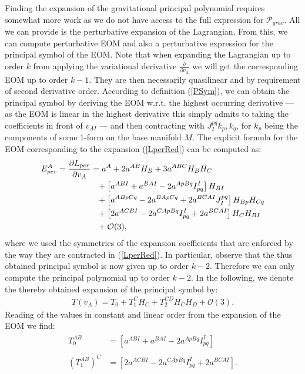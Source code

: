 Finding the expansion of the gravitational principal polynomial requires somewhat more work as we do not have access to the full expression for $\mathcal{P}_{grav}$. All we can provide is the perturbative expansion of the Lagrangian. From this, we can compute perturbative EOM and also a perturbative expression for the principal symbol of the EOM.
Note that when expanding the Lagrangian up to order $k$ from applying the variational derivative $\frac{\partial}{\partial v_A}$ we will get the corresponding EOM up to order $k-1$. They are then necessarily quasilinear and by requirement of second derivative order. According to definition (\ref{PSym}), we can obtain the principal symbol by deriving the EOM w.r.t. the highest occurring derivative  --- as the EOM is linear in the highest derivative this simply admits to taking the coefficients in front of $v_{AI}$ --- and then contracting with $J_I^{pq} k_p, k_q$, for $k_p$ being the components of some 1-form on the base manifold $M$. 
The explicit formula for the EOM corresponding to the expansion (\ref{LperRed}) can be computed as:
\begin{align}\label{EOMPert}
    \begin{aligned}
    E_{per}^A = \frac{\partial L_{per}}{\partial v_A} &= a^A + 2 a^{AB}H_B + 3a^{ABC}H_B H_C \\
    &\hphantom{=}+ \left [a^{ABI} + a^{BAI} - 2 a^{ApBq}I_{pq}^I  \right ] H_{BI} \\
    &\hphantom{=}+ \left[a^{ABpCq} -2a^{BApCq} +2a^{BCAI} J_I^{pq} \right]H_{Bp}H_{Cq} \\
    &\hphantom{=}+ \left [2a^{ACBI} -2a^{CApBq}I_{pq}^I + 2a^{BCAI} \right ]H_C H_{BI} \\
    &\hphantom{=}+ \mathcal{O}(3),
    \end{aligned}
\end{align}
where we used the symmetries of the expansion coefficients that are enforced by the way they are contracted in (\ref{LperRed}).
In particular, observe that the thus obtained principal symbol is now given up to order $k-2$. Therefore we can only compute the principal polynomial up to order $k-2$. In the following, we denote the thereby obtained expansion of the principal symbol by: 
\begin{align}
    T(v_A) = T_0 + T_1^CH_C + T_2^{CD}H_CH_D + \mathcal{O}(3).
\end{align}
Reading of the values in constant and linear order from the expansion of the EOM we find:
\begin{align}
    \begin{aligned}
    T_0^{AB} &= \left [a^{ABI} + a^{BAI} - 2 a^{ApBq}I_{pq}^I  \right ]\\
    \\
    (T_1^{AB})^C &= \left [2a^{ACBI} -2a^{CApBq}I_{pq}^I + 2a^{BCAI} \right ]. 
    \end{aligned}
\end{align}
